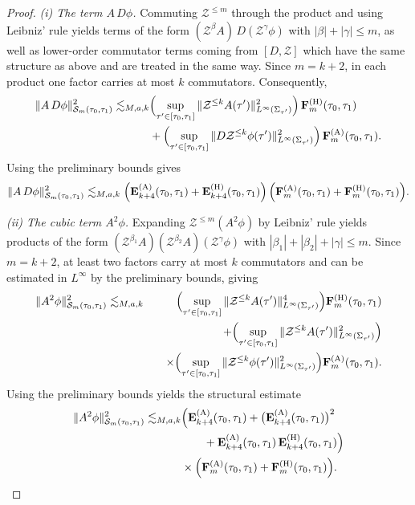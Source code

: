 \documentclass[11pt]{article}
\numberwithin{equation}{section}
\theoremstyle{plain}
\theoremstyle{definition}
\theoremstyle{remark}
\begin{document}
\begin{proof}
\smallskip\noindent
\emph{(i) The term $A\,D\phi$.}
Commuting $\mathcal Z^{\le m}$ through the product and using Leibniz' rule yields terms of the form
$(\mathcal Z^{\beta}A)\,D(\mathcal Z^{\gamma}\phi)$ with $|\beta|+|\gamma|\le m$,
as well as lower-order commutator terms coming from $[D,\mathcal Z]$ which have the same structure as above and are treated in the same way.
Since $m=k+2$, in each product one factor carries at most $k$ commutators.
Consequently,
\begin{eqnarray}
\|A\,D\phi\|_{\mathcal S_{m}(\tau_0,\tau_1)}^{2}
\lesssim_{M,a,k}
&\Bigl(
\sup_{\tau'\in[\tau_0,\tau_1]}\|\mathcal Z^{\le k}A(\tau')\|_{L^\infty(\Sigma_{\tau'})}^{2}
\Bigr)\,
\mathbf F_{m}^{(\mathrm H)}(\tau_0,\tau_1)\\
&+\Bigl(
\sup_{\tau'\in[\tau_0,\tau_1]}\|D\mathcal Z^{\le k}\phi(\tau')\|_{L^\infty(\Sigma_{\tau'})}^{2}
\Bigr)\,
\mathbf F_{m}^{(\mathrm A)}(\tau_0,\tau_1).
\end{eqnarray}
Using the preliminary bounds gives
\begin{equation}
\|A\,D\phi\|_{\mathcal S_{m}(\tau_0,\tau_1)}^{2}
\lesssim_{M,a,k}
\Bigl(\mathbf E_{k+4}^{(\mathrm A)}(\tau_0,\tau_1)+\mathbf E_{k+4}^{(\mathrm H)}(\tau_0,\tau_1)\Bigr)\,
\Bigl(\mathbf F_{m}^{(\mathrm A)}(\tau_0,\tau_1)+\mathbf F_{m}^{(\mathrm H)}(\tau_0,\tau_1)\Bigr).
\end{equation}

\smallskip\noindent
\emph{(ii) The cubic term $A^{2}\phi$.}
Expanding $\mathcal Z^{\le m}(A^{2}\phi)$ by Leibniz' rule yields products of the form
$(\mathcal Z^{\beta_1}A)(\mathcal Z^{\beta_2}A)(\mathcal Z^{\gamma}\phi)$ with $|\beta_1|+|\beta_2|+|\gamma|\le m$.
Since $m=k+2$, at least two factors carry at most $k$ commutators and can be estimated in $L^\infty$ by the preliminary bounds, giving
\begin{eqnarray}
\|A^{2}\phi\|_{\mathcal S_{m}(\tau_0,\tau_1)}^{2}
&\lesssim_{M,a,k}&
\Bigl(\sup_{\tau'\in[\tau_0,\tau_1]}
\|\mathcal Z^{\le k}A(\tau')\|_{L^\infty(\Sigma_{\tau'})}^{4}\Bigr)
\mathbf F_{m}^{(\mathrm H)}(\tau_0,\tau_1)\\
&&+\Bigl(\sup_{\tau'\in[\tau_0,\tau_1]}
\|\mathcal Z^{\le k}A(\tau')\|_{L^\infty(\Sigma_{\tau'})}^{2}\Bigr)\\
&&\quad\times
\Bigl(\sup_{\tau'\in[\tau_0,\tau_1]}
\|\mathcal Z^{\le k}\phi(\tau')\|_{L^\infty(\Sigma_{\tau'})}^{2}\Bigr)
\mathbf F_{m}^{(\mathrm A)}(\tau_0,\tau_1).
\end{eqnarray}
Using the preliminary bounds yields the structural estimate
\begin{eqnarray}
\|A^{2}\phi\|_{\mathcal S_{m}(\tau_0,\tau_1)}^{2}
\lesssim_{M,a,k}
&\Bigl(
\mathbf E_{k+4}^{(\mathrm A)}(\tau_0,\tau_1)
+\bigl(\mathbf E_{k+4}^{(\mathrm A)}(\tau_0,\tau_1)\bigr)^{2}\\
&\qquad
+\mathbf E_{k+4}^{(\mathrm A)}(\tau_0,\tau_1)\,\mathbf E_{k+4}^{(\mathrm H)}(\tau_0,\tau_1)
\Bigr)\\
&\times
\Bigl(
\mathbf F_{m}^{(\mathrm A)}(\tau_0,\tau_1)
+\mathbf F_{m}^{(\mathrm H)}(\tau_0,\tau_1)
\Bigr).
\end{eqnarray}


\end{proof}
\end{document}
